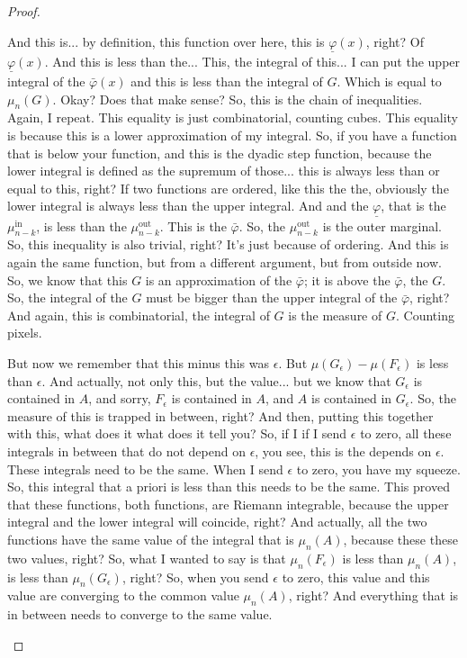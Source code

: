 \begin{proof}
\begin{spoken-clean}[00:11:42 - 00:14:47]
And this is... by definition, this function over here, this is $\underline{\varphi}(x)$, right? Of $\underline{\varphi}(x)$. And this is less than the... This, the integral of this... I can put the upper integral of the $\bar{\varphi}(x)$ and this is less than the integral of $G$. Which is equal to $\mu_n(G)$. Okay? Does that make sense? So, this is the chain of inequalities. Again, I repeat. This equality is just combinatorial, counting cubes. This equality is because this is a lower approximation of my integral. So, if you have a function that is below your function, and this is the dyadic step function, because the lower integral is defined as the supremum of those... this is always less than or equal to this, right? If two functions are ordered, like this the the, obviously the lower integral is always less than the upper integral. And and the $\underline{\varphi}$, that is the $\mu_{n-k}^{\text{in}}$, is less than the $\mu_{n-k}^{\text{out}}$. This is the $\bar{\varphi}$. So, the $\mu_{n-k}^{\text{out}}$ is the outer marginal. So, this inequality is also trivial, right? It's just because of ordering. And this is again the same function, but from a different argument, but from outside now. So, we know that this $G$ is an approximation of the $\bar{\varphi}$; it is above the $\bar{\varphi}$, the $G$. So, the integral of the $G$ must be bigger than the upper integral of the $\bar{\varphi}$, right? And again, this is combinatorial, the integral of $G$ is the measure of $G$. Counting pixels.
\end{spoken-clean}

\begin{spoken-clean}[00:14:47 - 00:15:39]
But now we remember that this minus this was $\epsilon$. But $\mu(G_\epsilon) - \mu(F_\epsilon)$ is less than $\epsilon$. And actually, not only this, but the value... but we know that $G_\epsilon$ is contained in $A$, and sorry, $F_\epsilon$ is contained in $A$, and $A$ is contained in $G_\epsilon$. So, the measure of this is trapped in between, right? And then, putting this together with this, what does it what does it tell you? So, if I if I send $\epsilon$ to zero, all these integrals in between that do not depend on $\epsilon$, you see, this is the depends on $\epsilon$. These integrals need to be the same. When I send $\epsilon$ to zero, you have my squeeze. So, this integral that a priori is less than this needs to be the same. This proved that these functions, both functions, are Riemann integrable, because the upper integral and the lower integral will coincide, right? And actually, all the two functions have the same value of the integral that is $\mu_n(A)$, because these these two values, right? So, what I wanted to say is that $\mu_n(F_\epsilon)$ is less than $\mu_n(A)$, is less than $\mu_n(G_\epsilon)$, right? So, when you send $\epsilon$ to zero, this value and this value are converging to the common value $\mu_n(A)$, right? And everything that is in between needs to converge to the same value.
\end{spoken-clean}


\end{proof}
